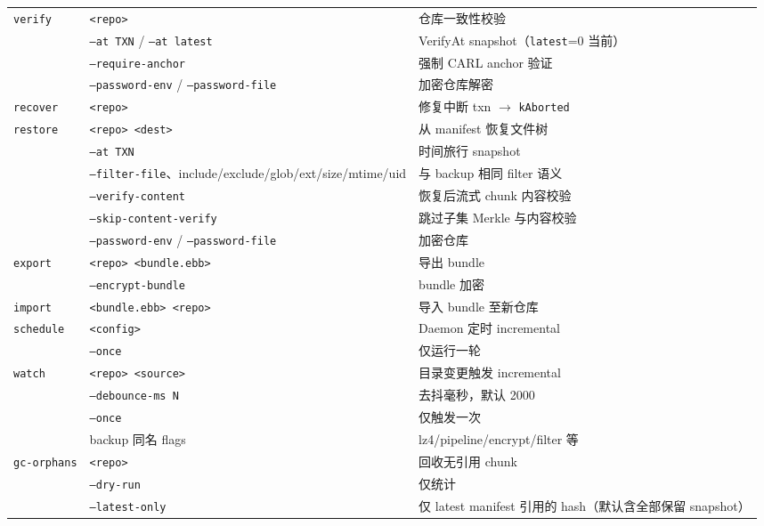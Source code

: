 \begin{longtable}{@{}p{2.2cm}p{4.8cm}p{7.2cm}@{}}
\texttt{verify} &
\texttt{<repo>} &
仓库一致性校验 \\
&
\texttt{--at TXN} / \texttt{--at latest} &
VerifyAt snapshot（\texttt{latest}=0 当前） \\
&
\texttt{--require-anchor} &
强制 CARL anchor 验证 \\
&
\texttt{--password-env} / \texttt{--password-file} &
加密仓库解密 \\
\midrule

\texttt{recover} &
\texttt{<repo>} &
修复中断 txn $\rightarrow$ \texttt{kAborted} \\
\midrule

\texttt{restore} &
\texttt{<repo> <dest>} &
从 manifest 恢复文件树 \\
&
\texttt{--at TXN} &
时间旅行 snapshot \\
&
\texttt{--filter-file}、include/exclude/glob/ext/size/mtime/uid &
与 backup 相同 filter 语义 \\
&
\texttt{--verify-content} &
恢复后流式 chunk 内容校验 \\
&
\texttt{--skip-content-verify} &
跳过子集 Merkle 与内容校验 \\
&
\texttt{--password-env} / \texttt{--password-file} &
加密仓库 \\
\midrule

\texttt{export} &
\texttt{<repo> <bundle.ebb>} &
导出 bundle \\
&
\texttt{--encrypt-bundle} &
bundle 加密 \\
\midrule

\texttt{import} &
\texttt{<bundle.ebb> <repo>} &
导入 bundle 至新仓库 \\
\midrule

\texttt{schedule} &
\texttt{<config>} &
Daemon 定时 incremental \\
&
\texttt{--once} &
仅运行一轮 \\
\midrule

\texttt{watch} &
\texttt{<repo> <source>} &
目录变更触发 incremental \\
&
\texttt{--debounce-ms N} &
去抖毫秒，默认 2000 \\
&
\texttt{--once} &
仅触发一次 \\
&
backup 同名 flags &
lz4/pipeline/encrypt/filter 等 \\
\midrule

\texttt{gc-orphans} &
\texttt{<repo>} &
回收无引用 chunk \\
&
\texttt{--dry-run} &
仅统计 \\
&
\texttt{--latest-only} &
仅 latest manifest 引用的 hash（默认含全部保留 snapshot） \\
\midrule


\end{longtable}
